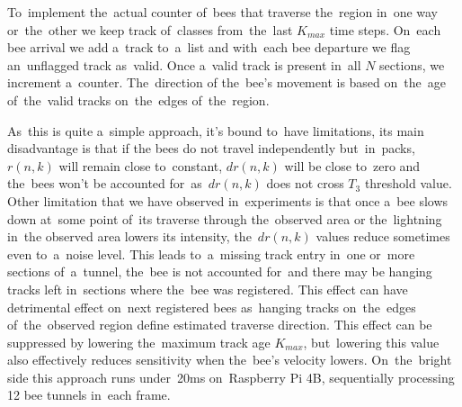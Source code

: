 To~implement the~actual counter of~bees that traverse the~region in~one way or~the~other we keep track of~classes from~the~last $K_{max}$ time steps. On~each bee arrival we add a~track to~a~list and with~each bee departure we flag an~unflagged track as~valid. Once a~valid track is present in~all $N$ sections, we increment a~counter. The~direction of the~bee's movement is based on~the~age of~the~valid tracks on~the~edges of~the~region.

As~this is quite a~simple approach, it's bound to~have limitations, its main disadvantage is that if the bees do not travel independently but~in~packs, $r(n,k)$ will remain close to~constant, $dr(n, k)$ will be close to~zero and the~bees won't be accounted for~as~$dr(n, k)$ does not cross $T_3$ threshold value. Other limitation that we have observed in~experiments is that once a~bee slows down at~some point of~its traverse through the~observed area or the~lightning in~the observed area lowers its intensity, the~$dr(n, k)$ values reduce sometimes even to~a~noise level. This leads to~a~missing track entry in~one or~more sections of~a~tunnel, the~bee is not accounted for~and there may be hanging tracks left in~sections where the~bee was registered. This effect can have detrimental effect on~next registered bees as~hanging tracks on~the~edges of~the~observed region define estimated traverse direction. This effect can be suppressed by lowering the~maximum track age $K_{max}$, but~lowering this value also effectively reduces sensitivity when the~bee's velocity lowers. On~the~bright side this approach runs under~20ms on~Raspberry Pi 4B, sequentially processing 12 bee tunnels in~each frame.